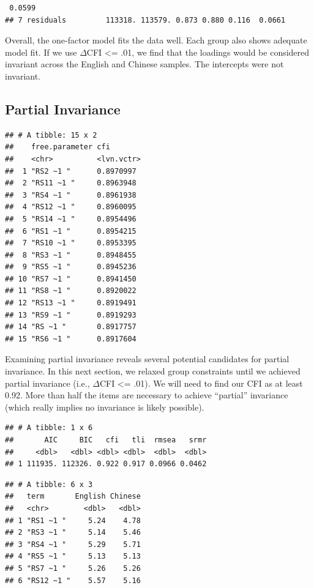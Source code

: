 \documentclass[
  man]{apa7}
\begin{document}
\begin{verbatim}
 0.0599
## 7 residuals         113318. 113579. 0.873 0.880 0.116  0.0661
\end{verbatim}

Overall, the one-factor model fits the data well. Each group also shows adequate model fit. If we use \(\Delta\)CFI \textless= .01, we find that the loadings would be considered invariant across the English and Chinese samples. The intercepts were not invariant.

\hypertarget{partial-invariance}{%
\subsection{Partial Invariance}\label{partial-invariance}}

\begin{verbatim}
## # A tibble: 15 x 2
##    free.parameter cfi       
##    <chr>          <lvn.vctr>
##  1 "RS2 ~1 "      0.8970997 
##  2 "RS11 ~1 "     0.8963948 
##  3 "RS4 ~1 "      0.8961938 
##  4 "RS12 ~1 "     0.8960095 
##  5 "RS14 ~1 "     0.8954496 
##  6 "RS1 ~1 "      0.8954215 
##  7 "RS10 ~1 "     0.8953395 
##  8 "RS3 ~1 "      0.8948455 
##  9 "RS5 ~1 "      0.8945236 
## 10 "RS7 ~1 "      0.8941450 
## 11 "RS8 ~1 "      0.8920022 
## 12 "RS13 ~1 "     0.8919491 
## 13 "RS9 ~1 "      0.8919293 
## 14 "RS ~1 "       0.8917757 
## 15 "RS6 ~1 "      0.8917604
\end{verbatim}

Examining partial invariance reveals several potential candidates for partial invariance. In this next section, we relaxed group constraints until we achieved partial invariance (i.e., \(\Delta\)CFI \textless= .01). We will need to find our CFI as at least 0.92. More than half the items are necessary to achieve ``partial'' invariance (which really implies no invariance is likely possible).

\begin{verbatim}
## # A tibble: 1 x 6
##       AIC     BIC   cfi   tli  rmsea   srmr
##     <dbl>   <dbl> <dbl> <dbl>  <dbl>  <dbl>
## 1 111935. 112326. 0.922 0.917 0.0966 0.0462
\end{verbatim}

\begin{verbatim}
## # A tibble: 6 x 3
##   term       English Chinese
##   <chr>        <dbl>   <dbl>
## 1 "RS1 ~1 "     5.24    4.78
## 2 "RS3 ~1 "     5.14    5.46
## 3 "RS4 ~1 "     5.29    5.71
## 4 "RS5 ~1 "     5.13    5.13
## 5 "RS7 ~1 "     5.26    5.26
## 6 "RS12 ~1 "    5.57    5.16
\end{verbatim}
\end{document}
